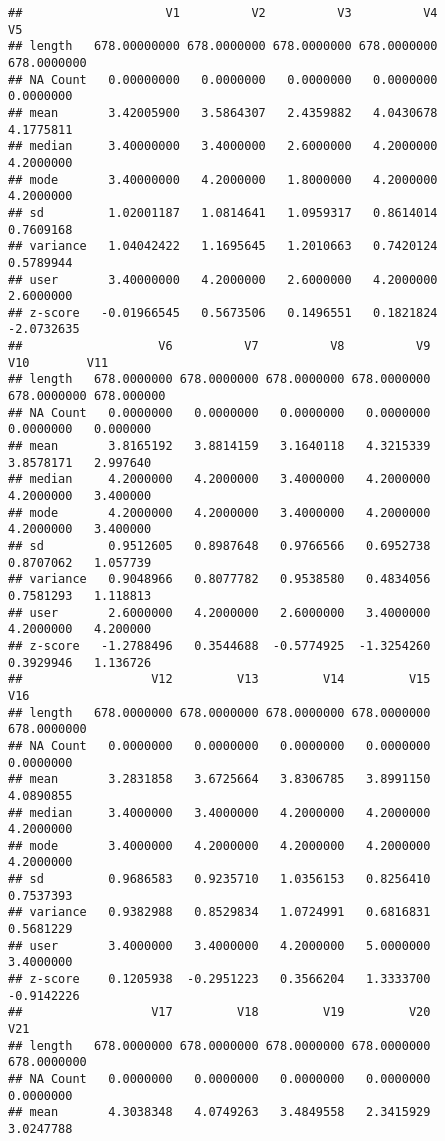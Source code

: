 \documentclass{article}
\begin{document}
\begin{verbatim}
##                    V1          V2          V3          V4          V5
## length   678.00000000 678.0000000 678.0000000 678.0000000 678.0000000
## NA Count   0.00000000   0.0000000   0.0000000   0.0000000   0.0000000
## mean       3.42005900   3.5864307   2.4359882   4.0430678   4.1775811
## median     3.40000000   3.4000000   2.6000000   4.2000000   4.2000000
## mode       3.40000000   4.2000000   1.8000000   4.2000000   4.2000000
## sd         1.02001187   1.0814641   1.0959317   0.8614014   0.7609168
## variance   1.04042422   1.1695645   1.2010663   0.7420124   0.5789944
## user       3.40000000   4.2000000   2.6000000   4.2000000   2.6000000
## z-score   -0.01966545   0.5673506   0.1496551   0.1821824  -2.0732635
##                   V6          V7          V8          V9         V10        V11
## length   678.0000000 678.0000000 678.0000000 678.0000000 678.0000000 678.000000
## NA Count   0.0000000   0.0000000   0.0000000   0.0000000   0.0000000   0.000000
## mean       3.8165192   3.8814159   3.1640118   4.3215339   3.8578171   2.997640
## median     4.2000000   4.2000000   3.4000000   4.2000000   4.2000000   3.400000
## mode       4.2000000   4.2000000   3.4000000   4.2000000   4.2000000   3.400000
## sd         0.9512605   0.8987648   0.9766566   0.6952738   0.8707062   1.057739
## variance   0.9048966   0.8077782   0.9538580   0.4834056   0.7581293   1.118813
## user       2.6000000   4.2000000   2.6000000   3.4000000   4.2000000   4.200000
## z-score   -1.2788496   0.3544688  -0.5774925  -1.3254260   0.3929946   1.136726
##                  V12         V13         V14         V15         V16
## length   678.0000000 678.0000000 678.0000000 678.0000000 678.0000000
## NA Count   0.0000000   0.0000000   0.0000000   0.0000000   0.0000000
## mean       3.2831858   3.6725664   3.8306785   3.8991150   4.0890855
## median     3.4000000   3.4000000   4.2000000   4.2000000   4.2000000
## mode       3.4000000   4.2000000   4.2000000   4.2000000   4.2000000
## sd         0.9686583   0.9235710   1.0356153   0.8256410   0.7537393
## variance   0.9382988   0.8529834   1.0724991   0.6816831   0.5681229
## user       3.4000000   3.4000000   4.2000000   5.0000000   3.4000000
## z-score    0.1205938  -0.2951223   0.3566204   1.3333700  -0.9142226
##                  V17         V18         V19         V20         V21
## length   678.0000000 678.0000000 678.0000000 678.0000000 678.0000000
## NA Count   0.0000000   0.0000000   0.0000000   0.0000000   0.0000000
## mean       4.3038348   4.0749263   3.4849558   2.3415929   3.0247788

\end{verbatim}
\end{document}
